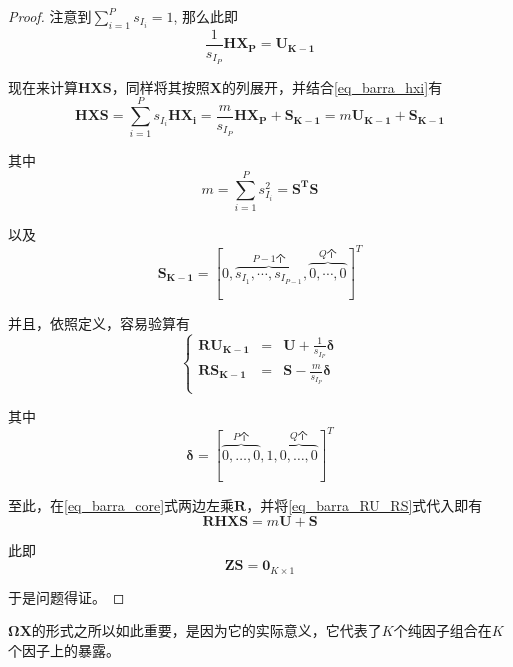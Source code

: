 \begin{proof}
    注意到$\sum_{i=1}^Ps_{I_i}=1$, 那么此即
    \begin{equation}
        \frac{1}{s_{I_P}}\bm{HX_P} = \bm{U_{K-1}}
    \end{equation}

    现在来计算$\bm{HXS}$，同样将其按照$\bm{X}$的列展开，并结合\ref{eq_barra_hxi}有
    \begin{equation}\label{eq_barra_core}
        \bm{HXS} = \sum_{i=1}^Ps_{I_i}\bm{HX_i} =\frac{m}{s_{I_P}}\bm{HX_P} + \bm{S_{K-1}} = m\bm{U_{K-1}} + \bm{S_{K-1}}
    \end{equation}

    其中
    \begin{equation}
        m = \sum_{i=1}^Ps_{I_i}^2 = \bm{S^TS}
    \end{equation}

    以及
    \begin{equation}
        \bm{S_{K-1}} = [0, \overbrace{s_{I_1},\cdots,s_{I_{P-1}}}^{P-1\text{个}}, \overbrace{0, \cdots, 0}^{Q\text{个}}]^T
    \end{equation}

    并且，依照定义，容易验算有
    \begin{equation}\label{eq_barra_RU_RS}
        \left\{
            \begin{array}{rcl}
                \bm{RU_{K-1}} & = & \bm{U} + \frac{1}{s_{I_P}}\bm{\delta} \\
                \bm{RS_{K-1}} & = & \bm{S} - \frac{m}{s_{I_P}}\bm{\delta} \\
            \end{array}
        \right.
    \end{equation}

    其中
    \begin{equation}
        \bm{\delta} = [\overbrace{0, \dots, 0}^{P\text{个}},1,\overbrace{0, \dots, 0}^{Q\text{个}}]^T
    \end{equation}

    至此，在\ref{eq_barra_core}式两边左乘$\bm{R}$，并将\ref{eq_barra_RU_RS}式代入即有
    \begin{equation}
        \bm{RHXS} = m\bm{U} + \bm{S}
    \end{equation}
    
    此即
    \begin{equation}
        \bm{ZS} = \bm{0}_{K\times 1}
    \end{equation}

    于是问题得证。
\end{proof}

\begin{remark}
    $\bm{\Omega X}$的形式之所以如此重要，是因为它的实际意义，它代表了$K$个纯因子组合在$K$个因子上的暴露。
\end{remark}

